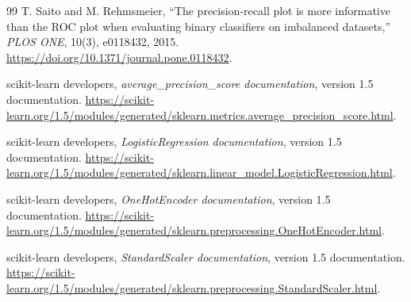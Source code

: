 \documentclass[11pt,a4paper]{article}
\begin{document}
\begin{thebibliography}{99}
T. Saito and M. Rehmsmeier,
``The precision-recall plot is more informative than the ROC plot
when evaluating binary classifiers on imbalanced datasets,''
\emph{PLOS ONE}, 10(3), e0118432, 2015.
\url{https://doi.org/10.1371/journal.pone.0118432}.

scikit-learn developers, \emph{average\_precision\_score documentation},
version 1.5 documentation.
\url{https://scikit-learn.org/1.5/modules/generated/sklearn.metrics.average_precision_score.html}.

scikit-learn developers, \emph{LogisticRegression documentation},
version 1.5 documentation.
\url{https://scikit-learn.org/1.5/modules/generated/sklearn.linear_model.LogisticRegression.html}.

scikit-learn developers, \emph{OneHotEncoder documentation},
version 1.5 documentation.
\url{https://scikit-learn.org/1.5/modules/generated/sklearn.preprocessing.OneHotEncoder.html}.

scikit-learn developers, \emph{StandardScaler documentation},
version 1.5 documentation.
\url{https://scikit-learn.org/1.5/modules/generated/sklearn.preprocessing.StandardScaler.html}.
\end{thebibliography}
\end{document}

